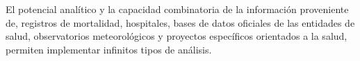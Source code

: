 El potencial analítico y la capacidad combinatoria de la información proveniente de, registros
de mortalidad, hospitales, bases de datos oficiales de las entidades de salud, observatorios
meteorológicos y proyectos específicos orientados a la salud, permiten implementar infinitos tipos
de análisis.
